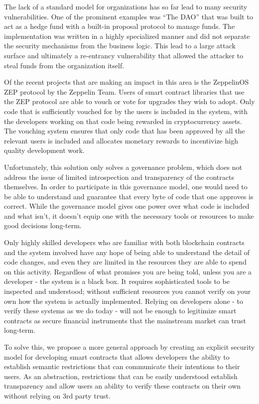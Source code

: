 \documentclass[english,a4paper]{article}
\begin{document}
The lack of a standard model for organizations has so far lead to many
security vulnerabilities. One of the prominent examples was ``The DAO''
that was built to act as a hedge fund with a built-in proposal protocol
to manage funds. The implementation was written in a highly specialized
manner and did not separate the security mechanisms from the business
logic. This lead to a large attack surface and ultimately a re-entrancy
vulnerability that allowed the attacker to steal funds from the
organization itself.

Of the recent projects that are making an impact in this area is the
ZeppelinOS ZEP protocol by the Zeppelin Team. Users of smart contract
libraries that use the ZEP protocol are able to vouch or vote for
upgrades they wish to adopt. Only code that is sufficiently vouched for
by the users is included in the system, with the developers working on
that code being rewarded in cryptocurrency assets. The vouching system
ensures that only code that has been approved by all the relevant users
is included and allocates monetary rewards to incentivize high quality
development work.

Unfortunately, this solution only solves a governance problem, which
does not address the issue of limited introspection and transparency of
the contracts themselves. In order to participate in this governance
model, one would need to be able to understand and guarantee that every
byte of code that one approves is correct. While the governance model
gives one power over what code is included and what isn't, it doesn't
equip one with the necessary tools or resources to make good decisions
long-term.

Only highly skilled developers who are familiar with both blockchain
contracts and the system involved have any hope of being able to
understand the detail of code changes, and even they are limited in the
resources they are able to spend on this activity. Regardless of what
promises you are being told, unless you are a developer - the system is
a black box. It requires sophisticated tools to be inspected and
understood; without sufficient resources you cannot verify on your own
how the system is actually implemented. Relying on developers alone - to
verify these systems as we do today - will not be enough to legitimize
smart contracts as secure financial instruments that the mainstream
market can trust long-term.

To solve this, we propose a more general approach by creating an
explicit security model for developing smart contracts that allows
developers the ability to establish semantic restrictions that can
communicate their intentions to their users. As an abstraction,
restrictions that can be easily understood establish transparency and
allow users an ability to verify these contracts on their own without
relying on 3rd party trust.
\end{document}
